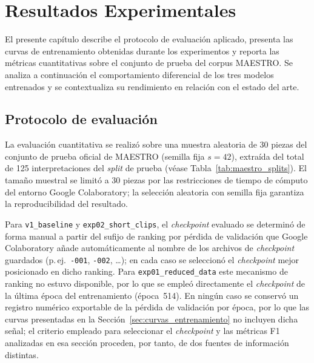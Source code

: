 
\chapter{Resultados Experimentales}
\label{cap:resultados}

El presente capítulo describe el protocolo de evaluación aplicado,
presenta las curvas de entrenamiento obtenidas durante los experimentos
y reporta las métricas cuantitativas sobre el conjunto de prueba del
corpus MAESTRO. Se analiza a continuación el comportamiento diferencial
de los tres modelos entrenados y se contextualiza su rendimiento en
relación con el estado del arte.

\section{Protocolo de evaluación}
\label{sec:protocolo_evaluacion}

La evaluación cuantitativa se realizó sobre una muestra aleatoria de
30 piezas del conjunto de prueba oficial de MAESTRO
(semilla fija $s = 42$), extraída del total de 125 interpretaciones
del \textit{split} de prueba (véase Tabla~\ref{tab:maestro_splits}).
El tamaño muestral se limitó a 30 piezas por las restricciones de
tiempo de cómputo del entorno Google Colaboratory; la selección
aleatoria con semilla fija garantiza la reproducibilidad del resultado.

Para \texttt{v1\_baseline} y \texttt{exp02\_short\_clips}, el
\textit{checkpoint} evaluado se determinó de forma manual a partir
del sufijo de ranking por pérdida de validación que Google
Colaboratory añade automáticamente al nombre de los archivos de
\textit{checkpoint} guardados (p.\,ej.\ \texttt{-001}, \texttt{-002},
\ldots); en cada caso se seleccionó el \textit{checkpoint} mejor
posicionado en dicho ranking. Para \texttt{exp01\_reduced\_data} este
mecanismo de ranking no estuvo disponible, por lo que se empleó
directamente el \textit{checkpoint} de la última época del
entrenamiento (época~514). En ningún caso se conservó un registro
numérico exportable de la pérdida de validación por época, por lo que
las curvas presentadas en la Sección~\ref{sec:curvas_entrenamiento}
no incluyen dicha señal; el criterio empleado para seleccionar el
\textit{checkpoint} y las métricas F1 analizadas en esa sección
proceden, por tanto, de dos fuentes de información distintas.

